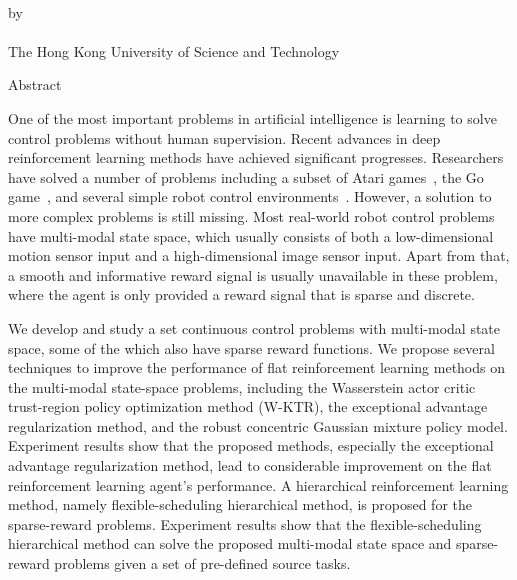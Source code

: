 \begin{center}
{\Large \thesistitle}\\
\vspace{20mm}
by \thesisauthor\\
\vspace{15mm}
\departmentname\\
\vspace{10mm}
The Hong Kong University of Science and Technology
\end{center}
\vspace{8mm}
\begin{center}
Abstract
\end{center}
One of the most important problems in artificial intelligence is learning to solve control problems without human supervision. Recent advances in deep reinforcement learning methods have achieved significant progresses. Researchers have solved a number of problems including a subset of Atari games~\cite{mnih2015human}, the Go game~\cite{silver2016mastering}, and several simple robot control environments~\cite{duan2016benchmarking}.  However, a solution to more complex problems is still missing. Most real-world robot control problems have multi-modal state space, which usually consists of both a low-dimensional motion sensor input and a high-dimensional image sensor input. Apart from that, a smooth and informative reward signal is usually unavailable in these problem, where the agent is only provided a reward signal that is sparse and discrete.

We develop and study a set continuous control problems with multi-modal state space, some of the which also have sparse reward functions. We propose several techniques to improve the performance of flat reinforcement learning methods on the multi-modal state-space problems, including the Wasserstein actor critic trust-region policy optimization method (W-KTR), the exceptional advantage regularization method, and the robust concentric Gaussian mixture policy model. Experiment results show that the proposed methods, especially the exceptional advantage regularization method, lead to considerable improvement on the flat reinforcement learning agent's performance. A hierarchical reinforcement learning method, namely flexible-scheduling hierarchical method, is proposed for the sparse-reward problems. Experiment results show that the flexible-scheduling hierarchical method can solve the proposed multi-modal state space and sparse-reward problems given a set of pre-defined source tasks.

\par
\noindent


